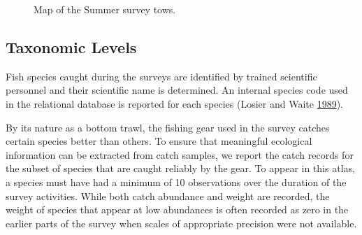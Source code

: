 \documentclass[12pt]{article}\usepackage[]{graphicx}\usepackage[]{color}
\begin{document}
\begin{figure}[htb]

{\centering {} 

}

\caption{Map of the Summer survey tows.}\label{fig:map3}
\end{figure}
\hypertarget{taxo}{%
\subsection{Taxonomic Levels}\label{taxo}}

Fish species caught during the surveys are identified by trained scientific personnel and their scientific name is determined. An internal species code used in the relational database is reported for each species (Losier and Waite \protect\hyperlink{ref-LosierWaite1989}{1989}).

By its nature as a bottom trawl, the fishing gear used in the survey catches certain species better than others. To ensure that meaningful ecological information can be extracted from catch samples, we report the catch records for the subset of species that are caught reliably by the gear. To appear in this atlas, a species must have had a minimum of 10 observations over the duration of the survey activities. While both catch abundance and weight are recorded, the weight of species that appear at low abundances is often recorded as zero in the earlier parts of the survey when scales of appropriate precision were not available.
\end{document}
